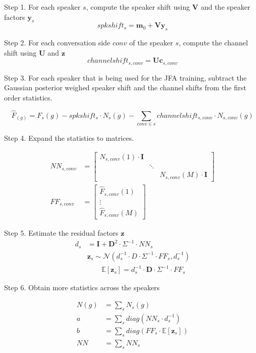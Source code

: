 Step 1. For each speaker $s$, compute the speaker shift using $\bm{V}$ and the speaker factors $\bm{y}_s$
$$ spkshift_s = \bm{m}_0 + \bm{Vy}_s $$

Step 2. For each conversation side $conv$ of the speaker $s$, compute the channel shift using $\bm{U}$ and $\bm{z}$
$$channelshift_{s,conv} = \bm{Uc}_{s,conv} $$

Step 3. For each speaker that is being used for the JFA training, subtract the Gaussian posterior weighed speaker shift and the channel shifts from the first order statistics.

$$\hat{F}_(g) = F_s(g) - spkshift_s \cdot N_s(g) - \sum_{conv \in s} channelshift_{s,conv} \cdot N_{s,conv}(g)$$

Step 4. Expand the statistics to matrices.

\begin{align*}
    NN_{s,conv} &= \begin{bmatrix} N_{s,conv}(1) \cdot \bm{I} & & \\ & \ddots & \\ & & N_{s,conv}(M) \cdot \bm{I}  \end{bmatrix} \\
    FF_{s,conv} &= \begin{bmatrix} \hat{F}_{s,conv}(1) \\ \vdots \\ \hat{F}_{s,conv}(M) \end{bmatrix}
\end{align*}

Step 5. Estimate the residual factors $\bm{z}$
\begin{align*}
    d_s &= \bm{I} + \bm{D}^2 \cdot \Sigma^{-1} \cdot NN_s \\
    &\bm{z}_s \sim \mathcal{N}(d^{-1}_s \cdot D \cdot \Sigma^{-1} \cdot FF_s , d^{-1}_s) \\
    &\quad \quad \mathbb{E}[\bm{z}_s] = d^{-1}_s \cdot \bm{D} \cdot \Sigma^{-1} \cdot FF_s
\end{align*}

Step 6. Obtain more statistics across the speakers

\begin{align*}
    N(g) &= \sum_s N_s (g) \\
    a &= \sum_s diag(NN_s \cdot d^{-1}_s) \\
    b &= \sum_s diag(FF_s \cdot \mathbb{E}[\bm{z}_s]) \\
    NN &= \sum_s NN_s
\end{align*}

